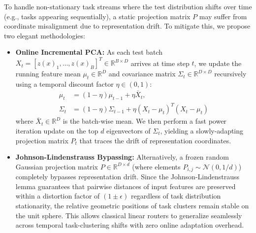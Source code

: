 To handle non-stationary task streams where the test distribution shifts over time (e.g., tasks appearing sequentially), a static projection matrix $P$ may suffer from coordinate misalignment due to representation drift. To mitigate this, we propose two elegant methodologies:
\begin{itemize}
    \item \textbf{Online Incremental PCA:} As each test batch $X_t = [z(x)_{1}, \dots, z(x)_{B}]^T \in \mathbb{R}^{B \times D}$ arrives at time step $t$, we update the running feature mean $\mu_t \in \mathbb{R}^D$ and covariance matrix $\Sigma_t \in \mathbb{R}^{D \times D}$ recursively using a temporal discount factor $\eta \in (0, 1)$:
    \begin{align}
        \mu_t &= (1 - \eta) \mu_{t-1} + \eta \bar{X}_t, \\
        \Sigma_t &= (1 - \eta) \Sigma_{t-1} + \eta (X_t - \mu_t)^T (X_t - \mu_t)
    \end{align}
    where $\bar{X}_t \in \mathbb{R}^D$ is the batch-wise mean. We then perform a fast power iteration update on the top $d$ eigenvectors of $\Sigma_t$, yielding a slowly-adapting projection matrix $P_t$ that traces the drift of representation coordinates.
    \item \textbf{Johnson-Lindenstrauss Bypassing:} Alternatively, a frozen random Gaussian projection matrix $P \in \mathbb{R}^{D \times d}$ (where elements $P_{i,j} \sim \mathcal{N}(0, 1/d)$) completely bypasses representation drift. Since the Johnson-Lindenstrauss lemma guarantees that pairwise distances of input features are preserved within a distortion factor of $(1\pm\epsilon)$ regardless of task distribution stationarity, the relative geometric positions of task clusters remain stable on the unit sphere. This allows classical linear routers to generalize seamlessly across temporal task-clustering shifts with zero online adaptation overhead.
\end{itemize}

